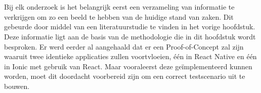 
\chapter{}%
\label{ch:methodologie}


Bij elk onderzoek is het belangrijk eerst een verzameling van informatie te verkrijgen om zo een beeld te hebben van de huidige stand van zaken. Dit gebeurde door middel van een literatuurstudie te vinden in het vorige hoofdstuk. Deze informatie ligt aan de basis van de methodologie die in dit hoofdstuk wordt besproken. Er werd eerder al aangehaald dat er een Proof-of-Concept zal zijn waaruit twee identieke applicaties zullen voortvloeien, één in React Native en één in Ionic met gebruik van React. Maar vooraleerst deze geïmplementeerd kunnen worden, moet dit doordacht voorbereid zijn om een correct testscenario uit te bouwen.

\section{}%
\label{sec:requirements-analyse}

